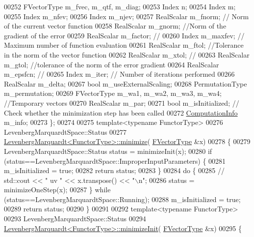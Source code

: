 \begin{DoxyCode}
00252     FVectorType m\_fvec, m\_qtf, m\_diag; 
00253     Index n;
00254     Index m; 
00255     Index m\_nfev;
00256     Index m\_njev; 
00257     RealScalar m\_fnorm; \textcolor{comment}{// Norm of the current vector function}
00258     RealScalar m\_gnorm; \textcolor{comment}{//Norm of the gradient of the error }
00259     RealScalar m\_factor; \textcolor{comment}{//}
00260     Index m\_maxfev; \textcolor{comment}{// Maximum number of function evaluation}
00261     RealScalar m\_ftol; \textcolor{comment}{//Tolerance in the norm of the vector function}
00262     RealScalar m\_xtol; \textcolor{comment}{// }
00263     RealScalar m\_gtol; \textcolor{comment}{//tolerance of the norm of the error gradient}
00264     RealScalar m\_epsfcn; \textcolor{comment}{//}
00265     Index m\_iter; \textcolor{comment}{// Number of iterations performed}
00266     RealScalar m\_delta;
00267     \textcolor{keywordtype}{bool} m\_useExternalScaling;
00268     PermutationType m\_permutation;
00269     FVectorType m\_wa1, m\_wa2, m\_wa3, m\_wa4; \textcolor{comment}{//Temporary vectors}
00270     RealScalar m\_par;
00271     \textcolor{keywordtype}{bool} m\_isInitialized; \textcolor{comment}{// Check whether the minimization step has been called}
00272     \hyperlink{group__enums_ga85fad7b87587764e5cf6b513a9e0ee5e}{ComputationInfo} m\_info; 
00273 \};
00274 
00275 \textcolor{keyword}{template}<\textcolor{keyword}{typename} FunctorType>
00276 LevenbergMarquardtSpace::Status
00277 \hyperlink{class_eigen_1_1_levenberg_marquardt}{LevenbergMarquardt<FunctorType>::minimize}(
      \hyperlink{group___core___module}{FVectorType}  &x)
00278 \{
00279     LevenbergMarquardtSpace::Status status = minimizeInit(x);
00280     \textcolor{keywordflow}{if} (status==LevenbergMarquardtSpace::ImproperInputParameters) \{
00281       m\_isInitialized = \textcolor{keyword}{true};
00282       \textcolor{keywordflow}{return} status;
00283     \}
00284     \textcolor{keywordflow}{do} \{
00285 \textcolor{comment}{//       std::cout << " uv " << x.transpose() << "\(\backslash\)n";}
00286         status = minimizeOneStep(x);
00287     \} \textcolor{keywordflow}{while} (status==LevenbergMarquardtSpace::Running);
00288      m\_isInitialized = \textcolor{keyword}{true};
00289      \textcolor{keywordflow}{return} status;
00290 \}
00291 
00292 \textcolor{keyword}{template}<\textcolor{keyword}{typename} FunctorType>
00293 LevenbergMarquardtSpace::Status
00294 \hyperlink{class_eigen_1_1_levenberg_marquardt}{LevenbergMarquardt<FunctorType>::minimizeInit}(
      \hyperlink{group___core___module}{FVectorType}  &x)
00295 \{

\end{DoxyCode}
